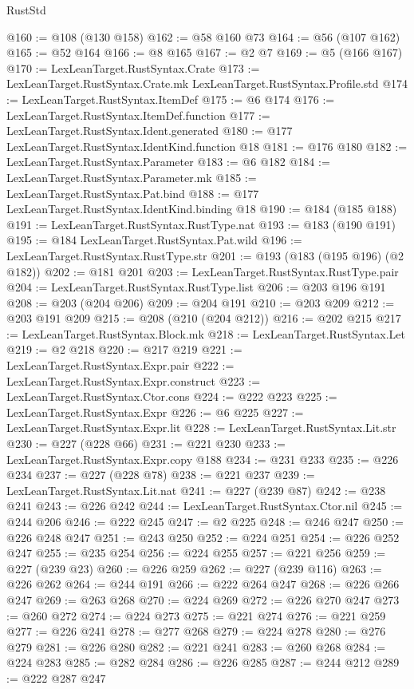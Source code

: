 \begin{lexlean}{RustStd}
\begin{coremodule}
@160 := @108 (@130 @158)
@162 := @58 @160 @73
@164 := @56 (@107 @162)
@165 := @52 @164
@166 := @8 @165
@167 := @2 @7
@169 := @5 (@166 @167)
@170 := LexLeanTarget.RustSyntax.Crate
@173 := LexLeanTarget.RustSyntax.Crate.mk LexLeanTarget.RustSyntax.Profile.std
@174 := LexLeanTarget.RustSyntax.ItemDef
@175 := @6 @174
@176 := LexLeanTarget.RustSyntax.ItemDef.function
@177 := LexLeanTarget.RustSyntax.Ident.generated
@180 := @177 LexLeanTarget.RustSyntax.IdentKind.function @18
@181 := @176 @180
@182 := LexLeanTarget.RustSyntax.Parameter
@183 := @6 @182
@184 := LexLeanTarget.RustSyntax.Parameter.mk
@185 := LexLeanTarget.RustSyntax.Pat.bind
@188 := @177 LexLeanTarget.RustSyntax.IdentKind.binding @18
@190 := @184 (@185 @188)
@191 := LexLeanTarget.RustSyntax.RustType.nat
@193 := @183 (@190 @191)
@195 := @184 LexLeanTarget.RustSyntax.Pat.wild
@196 := LexLeanTarget.RustSyntax.RustType.str
@201 := @193 (@183 (@195 @196) (@2 @182))
@202 := @181 @201
@203 := LexLeanTarget.RustSyntax.RustType.pair
@204 := LexLeanTarget.RustSyntax.RustType.list
@206 := @203 @196 @191
@208 := @203 (@204 @206)
@209 := @204 @191
@210 := @203 @209
@212 := @203 @191 @209
@215 := @208 (@210 (@204 @212))
@216 := @202 @215
@217 := LexLeanTarget.RustSyntax.Block.mk
@218 := LexLeanTarget.RustSyntax.Let
@219 := @2 @218
@220 := @217 @219
@221 := LexLeanTarget.RustSyntax.Expr.pair
@222 := LexLeanTarget.RustSyntax.Expr.construct
@223 := LexLeanTarget.RustSyntax.Ctor.cons
@224 := @222 @223
@225 := LexLeanTarget.RustSyntax.Expr
@226 := @6 @225
@227 := LexLeanTarget.RustSyntax.Expr.lit
@228 := LexLeanTarget.RustSyntax.Lit.str
@230 := @227 (@228 @66)
@231 := @221 @230
@233 := LexLeanTarget.RustSyntax.Expr.copy @188
@234 := @231 @233
@235 := @226 @234
@237 := @227 (@228 @78)
@238 := @221 @237
@239 := LexLeanTarget.RustSyntax.Lit.nat
@241 := @227 (@239 @87)
@242 := @238 @241
@243 := @226 @242
@244 := LexLeanTarget.RustSyntax.Ctor.nil
@245 := @244 @206
@246 := @222 @245
@247 := @2 @225
@248 := @246 @247
@250 := @226 @248 @247
@251 := @243 @250
@252 := @224 @251
@254 := @226 @252 @247
@255 := @235 @254
@256 := @224 @255
@257 := @221 @256
@259 := @227 (@239 @23)
@260 := @226 @259
@262 := @227 (@239 @116)
@263 := @226 @262
@264 := @244 @191
@266 := @222 @264 @247
@268 := @226 @266 @247
@269 := @263 @268
@270 := @224 @269
@272 := @226 @270 @247
@273 := @260 @272
@274 := @224 @273
@275 := @221 @274
@276 := @221 @259
@277 := @226 @241
@278 := @277 @268
@279 := @224 @278
@280 := @276 @279
@281 := @226 @280
@282 := @221 @241
@283 := @260 @268
@284 := @224 @283
@285 := @282 @284
@286 := @226 @285
@287 := @244 @212
@289 := @222 @287 @247

\end{coremodule}
\end{lexlean}
